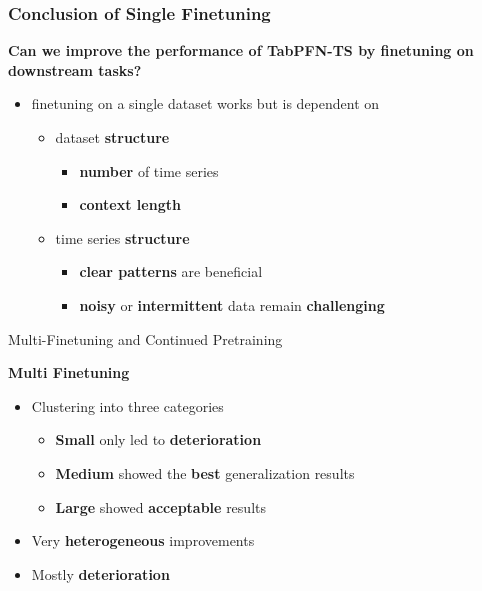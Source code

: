 \documentclass[t,aspectratio=169,svgnames]{beamer}
\begin{document}
\begin{frame}
\frametitle{Conclusion of Single Finetuning}
    \textbf{Can we improve the performance of TabPFN-TS by finetuning on downstream tasks?}
    \begin{itemize}
        \item finetuning on a single dataset works but is dependent on
        \begin{itemize}
            \setlength{\itemsep}{10pt}
            \item dataset \textbf{structure}
            \begin{itemize}
                \item \textbf{number} of time series
                \item \textbf{context length}
            \end{itemize}
            \item time series \textbf{structure}
            \begin{itemize}
                \setlength{\itemsep}{10pt}
                \item \textbf{clear patterns} are beneficial
                \item \textbf{noisy} or \textbf{intermittent} data remain \textbf{challenging}
            \end{itemize}
        \end{itemize}
    \end{itemize}
\end{frame}

\begin{frame}{Multi-Finetuning and Continued Pretraining}

\textbf{Multi Finetuning}
\begin{itemize}
    \item<1-> Clustering into three categories
    \begin{itemize}
        \item<2-> \textbf{Small} only led to \textbf{deterioration}
        \item<3-> \textbf{Medium} showed the \textbf{best} generalization results
        \item<4-> \textbf{Large} showed \textbf{acceptable} results
    \end{itemize}
\end{itemize}

\vspace{0.5cm}

\begin{itemize}
    \item<6-> Very \textbf{heterogeneous} improvements
    \item<7-> Mostly \textbf{deterioration}
\end{itemize}
\end{frame}
\end{document}
